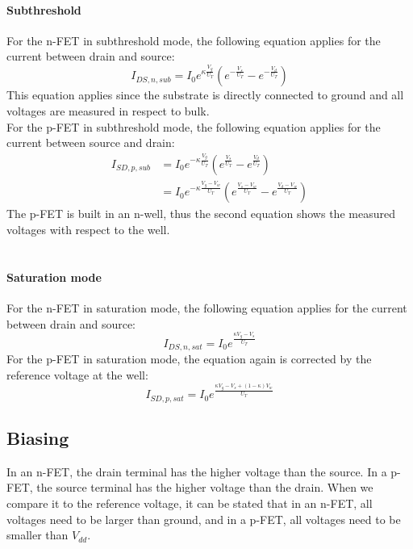 \documentclass[main]{subfiles}
\begin{document}
\paragraph{Subthreshold}
For the n-FET in subthreshold mode, the following equation applies for the current between drain and source:
\begin{equation}
I_{DS,n,sub} = I_0e^{\kappa\frac{V_g}{U_T}}(e^{-\frac{V_s}{U_T}}-e^{-\frac{V_d}{U_T}})
\label{eq:nFETsub}
\end{equation}
This equation applies since the substrate is directly connected to ground and all voltages are measured in respect to bulk.
\\
For the p-FET in subthreshold mode, the following equation applies for the current between source and drain:
\begin{align}
I_{SD,p,sub} &= I_0e^{-\kappa\frac{V_g}{U_T}}(e^{\frac{V_s}{U_T}}-e^{\frac{V_d}{U_T}})\\
	&=I_0e^{-\kappa\frac{V_g-V_w}{U_T}}(e^{\frac{V_s-V_w}{U_T}}-e^{\frac{V_d-V_w}{U_T}})
\label{eq:pFETsub}
\end{align}
The p-FET is built in an n-well, thus the second equation shows the measured voltages with respect to the well.\\\\


\paragraph{Saturation mode}
For the n-FET in saturation mode, the following equation applies for the current between drain and source:
\begin{equation}
I_{DS,n,sat} = I_0e^{\frac{\kappa V_g-V_s}{U_T}}
\label{eq:nFETsat}
\end{equation}
For the p-FET in saturation mode, the equation again is corrected by the reference voltage at the well:
\begin{equation}
I_{SD,p,sat} = I_0e^{\frac{\kappa V_g-V_s+(1-\kappa)V_w}{U_T}}
\label{pFETsat}
\end{equation}

\subsection{Biasing}

In an n-FET, the drain terminal has the higher voltage than the source. In a p-FET, the source terminal has the higher voltage than the drain. When we compare it to the reference voltage, it can be stated that in an n-FET, all voltages need to be larger than ground, and in a p-FET, all voltages need to be smaller than $V_{dd}$.\\
\end{document}

